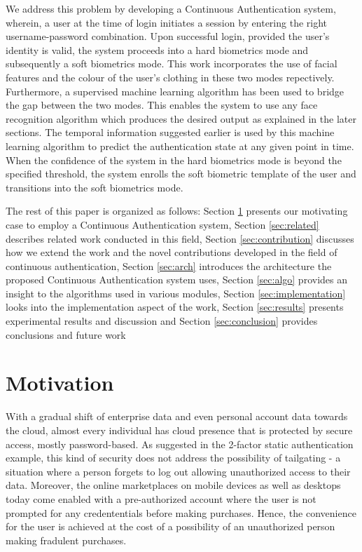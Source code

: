 \documentclass[%
        final,
        notitlepage,
        narroweqnarray,
        inline,
        ]{ieee}
\begin{document}
We address this problem by developing a Continuous Authentication system, wherein, a user at the time of login initiates a session by entering the right username-password combination.
Upon successful login, provided the user's identity is valid, the system proceeds into a hard biometrics mode and subsequently a soft biometrics mode.
This work incorporates the use of facial features and the colour of the user's clothing in these two modes repectively. 
Furthermore, a supervised machine learning algorithm has been used to bridge the gap between the two modes.
This enables the system to use any face recognition algorithm which produces the desired output as explained in the later sections.
The temporal information suggested earlier is used by this machine learning algorithm to predict the authentication state at any given point in time.
When the confidence of the system in the hard biometrics mode is beyond the specified threshold, the system enrolls the soft biometric template of the user and transitions into the soft biometrics mode.

The rest of this paper is organized as follows:
Section \ref{sec:motivation} presents our motivating case to employ a Continuous Authentication system,
Section \ref{sec:related} describes related work conducted in this field,
Section \ref{sec:contribution} discusses how we extend the work and the novel contributions developed in the field of continuous authentication,
Section \ref{sec:arch} introduces the architecture the proposed Continuous Authentication system uses,
Section \ref{sec:algo} provides an insight to the algorithms used in various modules,
Section \ref{sec:implementation} looks into the implementation aspect of the work,
Section \ref{sec:results} presents experimental results and discussion and
Section \ref{sec:conclusion} provides conclusions and future work

\section{Motivation} \label{sec:motivation}
With a gradual shift of enterprise data and even personal account data towards the cloud, almost every individual has cloud presence that is protected by secure access, mostly password-based.
As suggested in the 2-factor static authentication example, this kind of security does not address the possibility of tailgating - a situation where a person forgets to log out allowing unauthorized access to their data.
Moreover, the online marketplaces on mobile devices as well as desktops today come enabled with a pre-authorized account where the user is not prompted for any credententials before making purchases.
Hence, the convenience for the user is achieved at the cost of a possibility of an unauthorized person making fradulent purchases.
\end{document}
